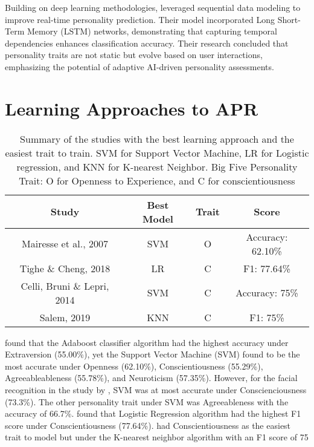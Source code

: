 Building on deep learning methodologies, \citet{Lima2022} leveraged sequential data modeling to improve real-time personality prediction. Their model incorporated Long Short-Term Memory (LSTM) networks, demonstrating that capturing temporal dependencies enhances classification accuracy. Their research concluded that personality traits are not static but evolve based on user interactions, emphasizing the potential of adaptive AI-driven personality assessments.

\section{Learning Approaches to APR}
\label{sec: LearningApproaches}

\begin{table}
\begin{center}
\begin{tabular}{|c|c|c|c|}
	\hline
	\textbf{Study} & \textbf{Best Model} & \textbf{Trait} & \textbf{Score} \\
	\hline
	Mairesse et al., 2007 & SVM & O & Accuracy: 62.10\% \\
	\hline
	Tighe \& Cheng, 2018 & LR & C & F1: 77.64\% \\
	\hline
	Celli, Bruni \& Lepri, 2014 & SVM & C & Accuracy: 75\% \\
	\hline
	Salem, 2019 & KNN & C & F1: 75\% \\
	\hline
\end{tabular}
\caption{Summary of the studies with 
	the best learning approach and the easiest trait to train.
	SVM for Support Vector Machine, LR for Logistic regression, and
	KNN for K-nearest Neighbor. Big Five Personality Trait: 
	O for Openness to Experience, and C for conscientiousness}
\label{learning_approach}
\end{center}
\end{table}




\citet{mairesse_using_2007} found that the Adaboost classifier algorithm had the highest accuracy under Extraversion (55.00\%), yet the Support Vector Machine (SVM) found to be the most accurate under Openness (62.10\%), Conscientiousness (55.29\%), Agreeableableness (55.78\%), and Neuroticism (57.35\%). However, for the facial recognition in the study by \citet{celli_automatic_2014}, SVM was at most accurate under Conscienciousness (73.3\%). The other personality trait under SVM was Agreeableness with the accuracy of 66.7\%. \citet{tighe_modeling_2018} found that Logistic Regression algorithm had the highest F1 score under Conscientiousness (77.64\%). \citet{salem_personality_2019} had Conscientiousness as the easiest trait to model but under the K-nearest neighbor algorithm with an F1 score of 75%

